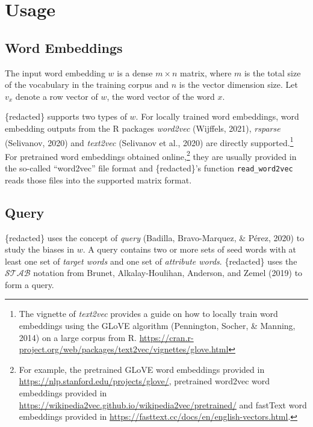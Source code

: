 \documentclass[english,man,mask]{apa6}
\begin{document}
\hypertarget{usage}{%
\section{Usage}\label{usage}}

\hypertarget{word-embeddings}{%
\subsection{Word Embeddings}\label{word-embeddings}}

The input word embedding \(w\) is a dense \(m\times n\) matrix, where \(m\) is the total size of the vocabulary in the training corpus and \(n\) is the vector dimension size. Let \(v_x\) denote a row vector of \(w\), the word vector of the word \(x\).

\{redacted\} supports two types of \(w\). For locally trained word embeddings, word embedding outputs from the R packages \emph{word2vec} (Wijffels, 2021), \emph{rsparse} (Selivanov, 2020) and \emph{text2vec} (Selivanov et al., 2020) are directly supported.\footnote{The vignette of \emph{text2vec} provides a guide on how to locally train word embeddings using the GLoVE algorithm (Pennington, Socher, \& Manning, 2014) on a large corpus from R. \url{https://cran.r-project.org/web/packages/text2vec/vignettes/glove.html}} For pretrained word embeddings obtained online,\footnote{For example, the pretrained GLoVE word embeddings provided in \url{https://nlp.stanford.edu/projects/glove/}, pretrained word2vec word embeddings provided in \url{https://wikipedia2vec.github.io/wikipedia2vec/pretrained/} and fastText word embeddings provided in \url{https://fasttext.cc/docs/en/english-vectors.html}.} they are usually provided in the so-called \enquote{word2vec} file format and \{redacted\}'s function \texttt{read\_word2vec} reads those files into the supported matrix format.

\hypertarget{query}{%
\subsection{Query}\label{query}}

\{redacted\} uses the concept of \emph{query} (Badilla, Bravo-Marquez, \& Pérez, 2020) to study the biases in \(w\). A query contains two or more sets of seed words with at least one set of \emph{target words} and one set of \emph{attribute words}. \{redacted\} uses the \(\mathcal{S}\mathcal{T}\mathcal{A}\mathcal{B}\) notation from Brunet, Alkalay-Houlihan, Anderson, and Zemel (2019) to form a query.
\end{document}
